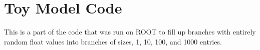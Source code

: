 \section{Toy Model Code}

This is a part of the code that was run on ROOT to fill up branches with entirely random float values into branches of sizes, 1, 10, 100, and 1000 entries.
